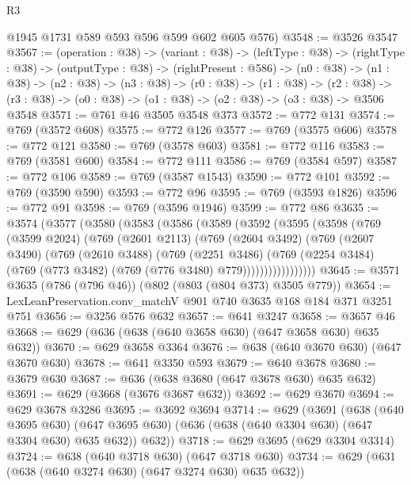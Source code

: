 \begin{lexlean}{R3}
\begin{coremodule}
      @1945
      @1731
      @589
      @593
      @596
      @599
      @602
      @605
      @576)
@3548 := @3526 @3547
@3567 := (operation : @38) ->
  (variant : @38) ->
  (leftType : @38) ->
  (rightType : @38) ->
  (outputType : @38) ->
  (rightPresent : @586) ->
  (n0 : @38) ->
  (n1 : @38) ->
  (n2 : @38) ->
  (n3 : @38) ->
  (r0 : @38) ->
  (r1 : @38) ->
  (r2 : @38) -> (r3 : @38) -> (o0 : @38) -> (o1 : @38) -> (o2 : @38) -> (o3 : @38) -> @3506 @3548
@3571 := @761 @46 @3505 @3548 @373
@3572 := @772 @131
@3574 := @769 (@3572 @608)
@3575 := @772 @126
@3577 := @769 (@3575 @606)
@3578 := @772 @121
@3580 := @769 (@3578 @603)
@3581 := @772 @116
@3583 := @769 (@3581 @600)
@3584 := @772 @111
@3586 := @769 (@3584 @597)
@3587 := @772 @106
@3589 := @769 (@3587 @1543)
@3590 := @772 @101
@3592 := @769 (@3590 @590)
@3593 := @772 @96
@3595 := @769 (@3593 @1826)
@3596 := @772 @91
@3598 := @769 (@3596 @1946)
@3599 := @772 @86
@3635 := @3574
    (@3577
      (@3580
        (@3583
          (@3586
            (@3589
              (@3592
                (@3595
                  (@3598
                    (@769
                      (@3599 @2024)
                      (@769
                        (@2601 @2113)
                        (@769
                          (@2604 @3492)
                          (@769
                            (@2607 @3490)
                            (@769
                              (@2610 @3488)
                              (@769
                                (@2251 @3486)
                                (@769
                                  (@2254 @3484)
                                  (@769 (@773 @3482) (@769 (@776 @3480) @779)))))))))))))))))
@3645 := @3571 @3635 (@786 (@796 @46)) (@802 (@803 (@804 @373) @3505 @779))
@3654 := LexLeanPreservation.conv_matchV @901 @740 @3635 @168 @184 @371 @3251 @751
@3656 := @3256 @576 @632
@3657 := @641 @3247
@3658 := @3657 @46
@3668 := @629 (@636 (@638 (@640 @3658 @630) (@647 @3658 @630) @635 @632))
@3670 := @629 @3658 @3364
@3676 := @638 (@640 @3670 @630) (@647 @3670 @630)
@3678 := @641 @3350 @593
@3679 := @640 @3678
@3680 := @3679 @630
@3687 := @636 (@638 @3680 (@647 @3678 @630) @635 @632)
@3691 := @629 (@3668 (@3676 @3687 @632))
@3692 := @629 @3670
@3694 := @629 @3678 @3286
@3695 := @3692 @3694
@3714 := @629
    (@3691
      (@638
        (@640 @3695 @630)
        (@647 @3695 @630)
        (@636 (@638 (@640 @3304 @630) (@647 @3304 @630) @635 @632))
        @632))
@3718 := @629 @3695 (@629 @3304 @3314)
@3724 := @638 (@640 @3718 @630) (@647 @3718 @630)
@3734 := @629 (@631 (@638 (@640 @3274 @630) (@647 @3274 @630) @635 @632))

\end{coremodule}
\end{lexlean}
